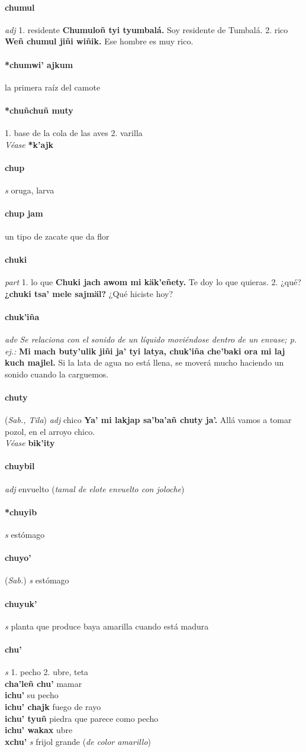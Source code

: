 \documentclass{scrbook}
\newcommand{\entry}[1]{\paragraph{#1}}
\newcommand{\onedefinition}[1]{#1.}
\newcommand{\nontranslationdef}[1]{\textit{#1}}
\newcommand{\partofspeech}[1]{\textit{#1}}
\newcommand{\spanishtranslation}[1]{#1}
\newcommand{\clarification}[1]{(\textit{#1})}
\newcommand{\cholexample}[1]{\textbf{#1}}
\newcommand{\exampletranslation}[1]{#1}
\newcommand{\alsosee}[1]{\\\textit{Véase} \textbf{#1}}
\newcommand{\relevantdialect}[1]{(\textit{#1})}
\newcommand{\secondaryentry}[1]{\\\textbf{#1}}
\newcommand{\secondpartofspeech}[1]{\textit{#1}}
\newcommand{\secondtranslation}[1]{#1}
\begin{document}
\begin{multicols}{2}
\entry{chumul}
\partofspeech{adj}
\onedefinition{1}
\spanishtranslation{residente}
\cholexample{Chumuloñ tyi tyumbalá.}
\exampletranslation{Soy residente de Tumbalá.}
\onedefinition{2}
\spanishtranslation{rico}
\cholexample{Weñ chumul jiñi wiñik.}
\exampletranslation{Ese hombre es muy rico.}

\entry{*chumwi' ajkum}
\spanishtranslation{la primera raíz del camote}

\entry{*chuñchuñ muty}
\onedefinition{1}
\spanishtranslation{base de la cola de las aves}
\onedefinition{2}
\spanishtranslation{varilla}
\alsosee{*k'ajk}

\entry{chup}
\partofspeech{s}
\spanishtranslation{oruga, larva}

\entry{chup jam}
\spanishtranslation{un tipo de zacate que da flor}

\entry{chuki}
\partofspeech{part}
\onedefinition{1}
\spanishtranslation{lo que}
\cholexample{Chuki jach awom mi käk'eñety.}
\exampletranslation{Te doy lo que quieras.}
\onedefinition{2}
\spanishtranslation{¿qué?}
\cholexample{¿chuki tsa' mele sajmäl?}
\exampletranslation{¿Qué hiciste hoy?}

\entry{chuk'iña}
\partofspeech{adv}
\nontranslationdef{Se relaciona con el sonido de un líquido moviéndose dentro de un envase; p. ej.:}
\cholexample{Mi mach buty'ulik jiñi ja' tyi latya, chuk'iña che'baki ora mi laj kuch majlel.}
\exampletranslation{Si la lata de agua no está llena, se moverá mucho haciendo un sonido cuando la carguemos.}

\entry{chuty}
\relevantdialect{Sab., Tila}
\partofspeech{adj}
\spanishtranslation{chico}
\cholexample{Ya' mi lakjap sa'ba'añ chuty ja'.}
\exampletranslation{Allá vamos a tomar pozol, en el arroyo chico.}
\alsosee{bik'ity}

\entry{chuybil}
\partofspeech{adj}
\spanishtranslation{envuelto}
\clarification{tamal de elote envuelto con joloche}

\entry{*chuyib}
\partofspeech{s}
\spanishtranslation{estómago}

\entry{chuyo'}
\relevantdialect{Sab.}
\partofspeech{s}
\spanishtranslation{estómago}

\entry{chuyuk'}
\partofspeech{s}
\spanishtranslation{planta que produce baya amarilla cuando está madura}

\entry{chu'}
\partofspeech{s}
\onedefinition{1}
\spanishtranslation{pecho}
\onedefinition{2}
\spanishtranslation{ubre, teta}
\secondaryentry{cha'leñ chu'}
\secondtranslation{mamar}
\secondaryentry{ichu'}
\secondtranslation{su pecho}
\secondaryentry{ichu' chajk}
\secondtranslation{fuego de rayo}
\secondaryentry{ichu' tyuñ}
\secondtranslation{piedra que parece como pecho}
\secondaryentry{ichu' wakax}
\secondtranslation{ubre}
\secondaryentry{xchu'}
\secondpartofspeech{s}
\secondtranslation{frijol grande}
\clarification{de color amarillo}


\end{multicols}
\end{document}
